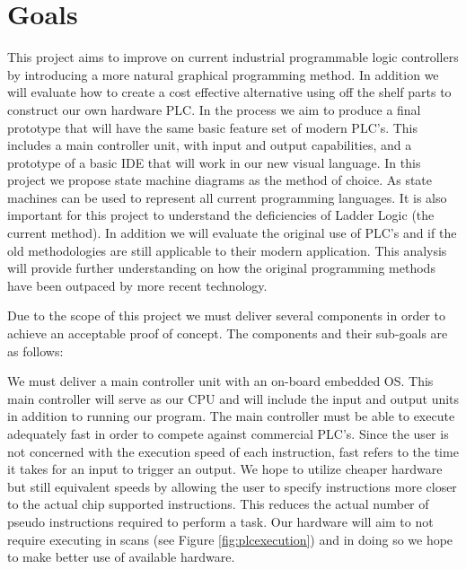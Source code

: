 \section{Goals}

This project aims to improve on current industrial programmable logic controllers by introducing a more natural graphical programming method. In addition we will evaluate how to create a cost effective alternative using off the shelf parts to construct our own hardware PLC. In the process we aim to produce a final prototype that will have the same basic feature set of modern PLC's. This includes a main controller unit, with input and output capabilities, and a prototype of a basic IDE that will work in our new visual language. In this project we propose state machine diagrams as the method of choice. As state machines can be used to represent all current programming languages. It is also important for this project to understand the deficiencies of Ladder Logic (the current method). In addition we will evaluate the original use of PLC's and if the old methodologies are still applicable to their modern application. This analysis will provide further understanding on how the original programming methods have been outpaced by more recent technology.

Due to the scope of this project we must deliver several components in order to achieve an acceptable proof of concept. The components and their sub-goals are as follows:

We must deliver a main controller unit with an on-board embedded OS. This main controller will serve as our CPU and will include the input and output units in addition to running our program. The main controller must be able to execute adequately fast in order to compete against commercial PLC's. Since the user is not concerned with the execution speed of each instruction, fast refers to the time it takes for an input to trigger an output. We hope to utilize cheaper hardware but still equivalent speeds by allowing the user to specify instructions more closer to the actual chip supported instructions. This reduces the actual number of pseudo instructions required to perform a task. Our hardware will aim to not require executing in scans (see Figure \ref{fig:plcexecution}) and in doing so we hope to make better use of available hardware.

